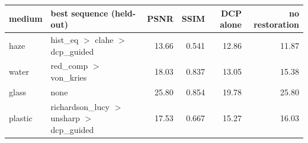 \begin{tabular}{llrrrr}
\toprule
medium & best sequence (held-out) & PSNR & SSIM & DCP alone & no restoration \\
\midrule
haze & hist\_eq $>$ clahe $>$ dcp\_guided & 13.66 & 0.541 & 12.86 & 11.87 \\
water & red\_comp $>$ von\_kries & 18.03 & 0.837 & 13.05 & 15.38 \\
glass & none & 25.80 & 0.854 & 19.78 & 25.80 \\
plastic & richardson\_lucy $>$ unsharp $>$ dcp\_guided & 17.53 & 0.667 & 15.27 & 16.03 \\
\bottomrule
\end{tabular}

